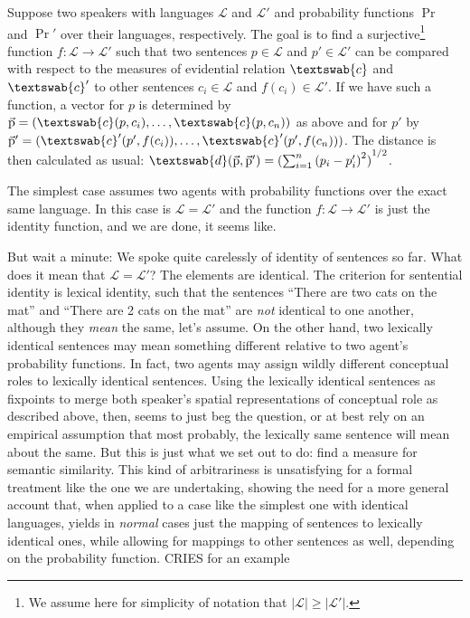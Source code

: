 \documentclass[11pt, a4paper]{scrartcl}
\renewcommand{\i}[1]{\emph{#1}}
\renewcommand{\L}{\mathcal{L}}
\renewcommand{\v}[1]{\vec{\mathrm{#1}}}
\newcommand{\m}[1]{\textswab{#1}}
\begin{document}
Suppose two speakers with languages $\L$ and $\L'$ and probability functions $\Pr$ and $\Pr'$ over their languages, respectively. The goal is to find a surjective\footnote{We assume here for simplicity of notation that $|\L| \geqslant |\L'|$.} function ${f: \L \rightarrow \L'}$ such that two sentences $p \in \L$ and $p' \in \L'$ can be compared with respect to the measures of evidential relation $\m{c}$ and $\m{c}'$ to other sentences $c_i \in \L$ and $f(c_i) \in \L'$. If we have such a function, a vector for $p$ is determined by $\v{p} = (\m{c}(p,c_i),\ldots,\m{c}(p,c_n))$ as above and for $p'$ by $\v{p}' = (\m{c}'(p',f(c_i)),\ldots,\m{c}'(p',f(c_n)))$. The distance is then calculated as usual: $\m{d}(\v{p},\v{p}')= {( \sum_{i=1}^n {(p_i-p_i')}^2 )}^{1/2}$.  

The simplest case assumes two agents with probability functions over the exact same language. In this case is $\L = \L'$ and the function $f: \L \rightarrow \L'$ is just the identity function, and we are done, it seems like.

But wait a minute: We spoke quite carelessly of identity of sentences so far. What does it mean that $\L = \L'$? The elements are identical. The criterion for sentential identity is lexical identity, such that the sentences ``There are two cats on the mat'' and ``There are 2 cats on the mat'' are \i{not} identical to one another, although they \i{mean} the same, let's assume. On the other hand, two lexically identical sentences may mean something different relative to two agent's probability functions. In fact, two agents may assign wildly different conceptual roles to lexically identical sentences. Using the lexically identical sentences as fixpoints to merge both speaker's spatial representations of conceptual role as described above, then, seems to just beg the question, or at best rely on an empirical assumption that most probably, the lexically same sentence will mean about the same. But this is just what we set out to do: find a measure for semantic similarity. This kind of arbitrariness is unsatisfying for a formal treatment like the one we are undertaking, showing the need for a more general account that, when applied to a case like the simplest one with identical languages, yields in \i{normal} cases just the mapping of sentences to lexically identical ones, while allowing for mappings to other sentences as well, depending on the probability function.{\color{red} CRIES for an example} 
\end{document}
